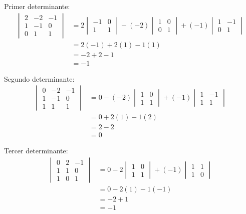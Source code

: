 \documentclass{article}
\begin{document}
Primer determinante:
\begin{align}
    \begin{vmatrix}
    2 & -2 & -1 \\
    1 & -1 & 0 \\
    0 & 1 & 1
    \end{vmatrix} &= 2 \begin{vmatrix} -1 & 0 \\ 1 & 1 \end{vmatrix} - (-2) \begin{vmatrix} 1 & 0 \\ 0 & 1 \end{vmatrix} + (-1) \begin{vmatrix} 1 & -1 \\ 0 & 1 \end{vmatrix} \\
    &= 2(-1) + 2(1) - 1(1) \\
    &= -2 + 2 - 1 \\
    &= -1
\end{align}

Segundo determinante:
\begin{align}
    \begin{vmatrix}
    0 & -2 & -1 \\
    1 & -1 & 0 \\
    1 & 1 & 1
    \end{vmatrix} &= 0 - (-2) \begin{vmatrix} 1 & 0 \\ 1 & 1 \end{vmatrix} + (-1) \begin{vmatrix} 1 & -1 \\ 1 & 1 \end{vmatrix} \\
    &= 0 + 2(1) - 1(2) \\
    &= 2 - 2 \\
    &= 0
\end{align}

Tercer determinante:
\begin{align}
    \begin{vmatrix}
    0 & 2 & -1 \\
    1 & 1 & 0 \\
    1 & 0 & 1
    \end{vmatrix} &= 0 - 2 \begin{vmatrix} 1 & 0 \\ 1 & 1 \end{vmatrix} + (-1) \begin{vmatrix} 1 & 1 \\ 1 & 0 \end{vmatrix} \\
    &= 0 - 2(1) - 1(-1) \\
    &= -2 + 1 \\
    &= -1
\end{align}
\end{document}

